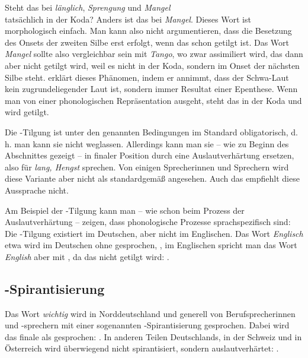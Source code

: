 \begin{Exkurs}{Steht das  bei \textit{länglich}, \textit{Sprengung} und \textit{Mangel}\\ tatsächlich in der Koda?}
Anders ist das bei \textit{Mangel}. Dieses Wort ist morphologisch einfach. Man kann also nicht argumentieren, dass die Besetzung des Onsets der zweiten Silbe erst erfolgt, wenn das  schon getilgt ist. Das Wort \textit{Mangel} sollte also vergleichbar sein mit \textit{Tango}, wo zwar assimiliert wird, das  dann aber nicht getilgt wird, weil es nicht in der Koda, sondern im Onset der nächsten Silbe steht. \citet[823--830]{Hall1989} erklärt dieses Phänomen, indem er annimmt, dass der Schwa-Laut kein zugrundeliegender Laut ist, sondern immer Resultat einer Epenthese. Wenn man von einer phonologischen Repräsentation  ausgeht, steht das  in der Koda und wird getilgt.

\end{Exkurs}

Die -Tilgung ist unter den genannten Bedingungen im Standard obligatorisch, d.\,h. man kann sie nicht weglassen. Allerdings kann man sie -- wie zu Beginn des Abschnittes gezeigt -- in finaler Position durch eine Auslautverhärtung ersetzen, also  für \textit{lang, Hengst} sprechen. Von einigen Sprecherinnen und Sprechern wird diese Variante aber nicht als standardgemäß angesehen. Auch das \citet[138]{DudenZweifelsfaelle2021} empfiehlt diese Aussprache nicht. 

Am Beispiel der -Tilgung kann man -- wie schon beim Prozess der Auslautverhärtung -- zeigen, dass phonologische Prozesse sprachspezifisch sind: Die -Tilgung existiert im Deutschen, aber \zB nicht im Englischen. Das Wort \textit{Englisch} etwa wird im Deutschen ohne \textipa{[g]} gesprochen, , im Englischen spricht man das Wort \textit{English} aber mit \textipa{[g]}, da das  nicht getilgt wird: .


\subsection{-Spirantisierung}\label{sec:g-Spirantisierung}

Das Wort \textit{wichtig} wird in Norddeutschland und generell von Berufsprecherinnen und -sprechern mit einer sogenannten -Spirantisierung gesprochen. Dabei wird das finale  als \textipa{[\c{c}]} gesprochen: \textipa{[\textprimstress vI\c{c}tI\c{c}]}. In anderen Teilen Deutschlands, in der Schweiz und in Österreich wird überwiegend nicht spirantisiert, sondern auslautverhärtet:  \citep[475]{DudenAussprache2023}.

